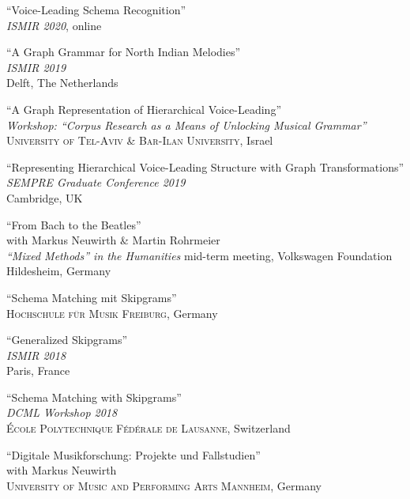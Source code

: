 \documentclass[10pt]{scrartcl}
\newcommand{\margintext}[1]{\marginpar{\raggedleft\small#1}}
\newcommand{\entry}[1]{\vphantom{x}\margintext{#1}}
\begin{document}
\entry{2020}%
\contrib \poster \enquote{Voice-Leading Schema Recognition}
\\
\textit{ISMIR 2020}, online

\entry{2019}%
\contrib \poster \enquote{A Graph Grammar for North Indian Melodies}
\\
\textit{ISMIR 2019}\\
Delft, The Netherlands

\invited \enquote{A Graph Representation of Hierarchical Voice-Leading}
\\
\textit{Workshop: \enquote{Corpus Research as a Means of Unlocking Musical Grammar}}\\
\textsc{University of Tel-Aviv \& Bar-Ilan University}, Israel

\poster \enquote{Representing Hierarchical Voice-Leading Structure with Graph Transformations}\\
\textit{SEMPRE Graduate Conference 2019}\\
Cambridge, UK

\contrib \enquote{From Bach to the Beatles}
\\
with Markus Neuwirth \& Martin Rohrmeier\\
\textit{\enquote{Mixed Methods} in the Humanities} mid-term meeting, Volkswagen Foundation\\
Hildesheim, Germany

\invited \enquote{Schema Matching mit Skipgrams}
\\
\textsc{Hochschule für Musik Freiburg}, Germany

\entry{2018}%
\contrib \poster \enquote{Generalized Skipgrams}
\\
\textit{ISMIR 2018}\\
Paris, France

\invited \enquote{Schema Matching with Skipgrams}
\\
\textit{DCML Workshop 2018}\\
\textsc{École Polytechnique Fédérale de Lausanne}, Switzerland

\invited \enquote{Digitale Musikforschung: Projekte und Fallstudien}
\\
with Markus Neuwirth\\
\textsc{University of Music and Performing Arts Mannheim}, Germany
\end{document}
